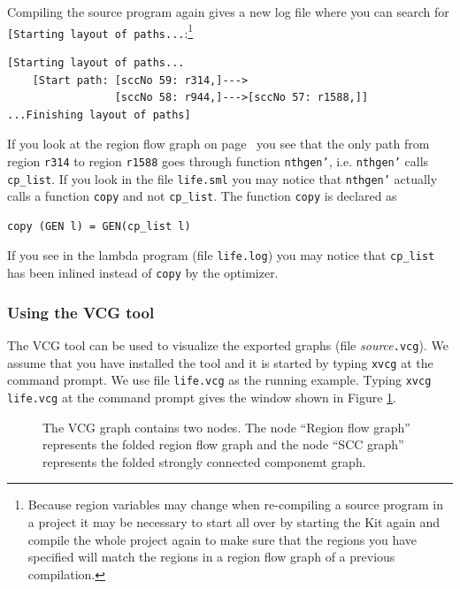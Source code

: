 \documentclass[12pt]{book}
\begin{document}
Compiling the source program again gives a new log file where you can
search for \texttt{[Starting layout of paths...}:\footnote{Because region
  variables may change when re-compiling a source program in a project it
  may be necessary to start all over by starting the Kit again and compile
  the whole project again to make sure that the regions you have specified
  will match the regions in a region flow graph of a previous compilation.}

\begin{verbatim}
[Starting layout of paths...
    [Start path: [sccNo 59: r314,]--->
                 [sccNo 58: r944,]--->[sccNo 57: r1588,]]
...Finishing layout of paths]
\end{verbatim}
\noindent
If you look at the region flow graph on
page~\pageref{reg_flow_graph.ex} you see that the only path from
region \texttt{r314} to region \texttt{r1588} goes through function
\texttt{nthgen'}, i.e. \texttt{nthgen'} calls \texttt{cp\_list}. If
you look in the file \texttt{life.sml} you may notice that
\texttt{nthgen'} actually calls a function \texttt{copy} and not
\texttt{cp\_list}. The function \texttt{copy} is declared as

\begin{verbatim}
copy (GEN l) = GEN(cp_list l)
\end{verbatim}
\noindent
If you see in the lambda program (file \texttt{life.log}) you may notice
that \texttt{cp\_list} has been inlined instead of \texttt{copy} by the
optimizer.

\subsubsection{Using the VCG tool}

The VCG tool can be used to visualize the exported graphs
(file \emph{source}\texttt{.vcg}). We assume that you have installed the
tool and it is started by typing \texttt{xvcg} at the command prompt.  We
use file \texttt{life.vcg} as the running example. Typing
\mbox{\texttt{xvcg life.vcg}} at the command prompt gives the window shown
in Figure \ref{vcg1.fig}.

\begin{figure}[htb]
\begin{center}
  \caption{The VCG graph contains two nodes. The
    node ``Region flow graph'' represents the folded region flow graph and
    the node ``SCC graph'' represents the folded strongly connected
    componemt graph.}\label{vcg1.fig}
\end{center}
\end{figure}
\end{document}
